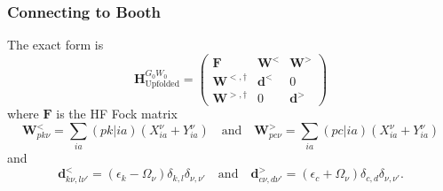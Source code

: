 \subsubsection{Connecting to Booth}
The exact form is
\begin{equation}
    \bm{H}_{\text{Upfolded}}^{G_0W_0} = \begin{pmatrix} \bm{F} & \bm{W}^< & \bm{W}^> \\ \bm{W}^{<,\dagger} & \bm{d}^< & 0 \\ \bm{W}^{>, \dagger} & 0 & \bm{d}^> \end{pmatrix}
\label{eq:booth_hamiltonian}
\end{equation}
where $\bm{F}$ is the HF Fock matrix
\begin{equation}
    \bm{W}^<_{pk\nu} = \sum_{ia} (pk|ia) \left( X_{ia}^{\nu} + Y_{ia}^{\nu} \right) \quad \text{and} \quad \bm{W}^>_{pc\nu} = \sum_{ia} (pc|ia) \left( X_{ia}^{\nu} + Y_{ia}^{\nu} \right)
\end{equation}
and 
\begin{equation}
    \bm{d}^<_{k\nu , l\nu'} = \left(\epsilon_k - \Omega_\nu\right) \delta_{k,l} \delta_{\nu,\nu'} \quad \text{and} \quad \bm{d}^>_{c\nu , d\nu'} = \left(\epsilon_c + \Omega_\nu\right) \delta_{c,d} \delta_{\nu,\nu'}.
\end{equation}
